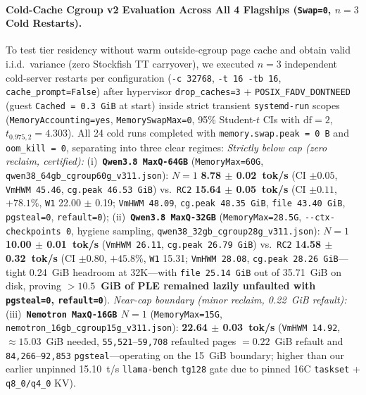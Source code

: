 \documentclass[10pt,twocolumn]{article}
\begin{document}
\paragraph{Cold-Cache Cgroup v2 Evaluation Across All 4 Flagships (\texttt{Swap=0}, $n=3$ Cold Restarts).}
To test tier residency without warm outside-cgroup page cache and obtain valid i.i.d.\ variance (zero Stockfish TT carryover), we executed $n=3$ independent cold-server restarts per configuration (\texttt{-c 32768}, \texttt{-t 16 -tb 16}, \texttt{cache\_prompt=False}) after hypervisor \texttt{drop\_caches=3} + \texttt{POSIX\_FADV\_DONTNEED} (guest \texttt{Cached = 0.3~GiB} at start) inside strict transient \texttt{systemd-run} scopes (\texttt{MemoryAccounting=yes}, \texttt{MemorySwapMax=0}, 95\% Student-$t$ CIs with $\text{df}=2$, $t_{0.975,2}=4.303$). All 24 cold runs completed with \texttt{memory.swap.peak = 0~B} and \texttt{oom\_kill = 0}, separating into three clear regimes:
\emph{Strictly below cap (zero reclaim, certified):}
(i)~\textbf{\texttt{Qwen3.8 MaxQ-64GB}} (\texttt{MemoryMax=60G}, \texttt{qwen38\_64gb\_cgroup60g\_v311.json}): $N=1$ \textbf{8.78 $\pm$ 0.02~tok/s} (CI $\pm 0.05$, \texttt{VmHWM 45.46}, \texttt{cg.peak 46.53~GiB}) vs.\ \texttt{RC2} \textbf{15.64 $\pm$ 0.05~tok/s} (CI $\pm 0.11$, $+78.1\%$, \texttt{W1} 22.00 $\pm$ 0.19; \texttt{VmHWM 48.09}, \texttt{cg.peak 48.35~GiB}, \texttt{file 43.40~GiB}, \texttt{pgsteal=0}, \texttt{refault=0});
(ii)~\textbf{\texttt{Qwen3.8 MaxQ-32GB}} (\texttt{MemoryMax=28.5G}, \texttt{{-}{-}ctx-checkpoints 0}, hygiene sampling, \texttt{qwen38\_32gb\_cgroup28g\_v311.json}): $N=1$ \textbf{10.00 $\pm$ 0.01~tok/s} (\texttt{VmHWM 26.11}, \texttt{cg.peak 26.79~GiB}) vs.\ \texttt{RC2} \textbf{14.58 $\pm$ 0.32~tok/s} (CI $\pm 0.80$, $+45.8\%$, \texttt{W1} 15.31; \texttt{VmHWM 28.08}, \texttt{cg.peak 28.26~GiB}---tight 0.24~GiB headroom at 32K---with \texttt{file 25.14~GiB} out of 35.71~GiB on disk, proving \textbf{$>10.5$~GiB of PLE remained lazily unfaulted with \texttt{pgsteal=0}, \texttt{refault=0}}).
\emph{Near-cap boundary (minor reclaim, 0.22~GiB refault):}
(iii)~\textbf{\texttt{Nemotron MaxQ-16GB} $N=1$} (\texttt{MemoryMax=15G}, \texttt{nemotron\_16gb\_cgroup15g\_v311.json}): \textbf{22.64 $\pm$ 0.03~tok/s} (\texttt{VmHWM 14.92}, ${\approx}15.03$~GiB needed, \texttt{55,521}--\texttt{59,708} refaulted pages $= 0.22$~GiB refault and \texttt{84,266}--\texttt{92,853} \texttt{pgsteal}---operating on the 15~GiB boundary; higher than our earlier unpinned 15.10~t/s \texttt{llama-bench} \texttt{tg128} gate due to pinned 16C \texttt{taskset} + \texttt{q8\_0/q4\_0} KV).
\end{document}
